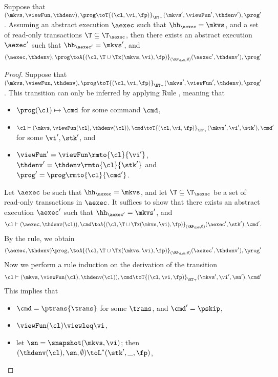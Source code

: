 \begin{proposition}
\label{prop:kv2aexec_transition}
Suppose that $(\mkvs, \viewFun, \thdenv), \prog \toT{(\cl, \vi, \fp)}_{\ET_{\top}} (\mkvs', 
\viewFun', \thdenv'), \prog'$. Assuming an abstract execution $\aexec$ 
such that $\hh_{\aexec} = \mkvs$, and a set of read-only transactions $\T \subseteq \T_{\aexec}$,
then there exists an abstract execution $\aexec'$ such that $\hh_{\aexec'} = \mkvs'$, and 
\[
(\aexec, \thdenv), \prog \toA{(\cl, \T \cup \Tx(\mkvs, \vi), \fp)}_{(\RP_{\LWW}, \emptyset)}
(\aexec', \thdenv'), \prog'
\]
\end{proposition}
\begin{proof}
Suppose that $(\mkvs, \viewFun, \thdenv), \prog \toT{(\cl, \vi, \fp)}_{\ET_{\top}} (\mkvs', \viewFun', \thdenv), \prog'$. 
This transition can only be inferred by applying Rule , meaning that 
\begin{itemize}
\item $\prog(\cl) \mapsto \cmd$ for some command $\cmd$, 
\item $\cl \vdash (\mkvs, \viewFun(\cl), \thdenv(\cl)), \cmd \toT{(\cl, \vi, \fp)}_{\ET_{\top}} (\mkvs', \vi', \stk'), \cmd'$ 
for some $\vi', \stk'$, and 
\item $\viewFun' = \viewFun\rmto{\cl}{\vi'}$, $\thdenv' = \thdenv\rmto{\cl}{\stk'}$ and $\prog' = \prog\rmto{\cl}{\cmd'}$. 
\end{itemize}
Let $\aexec$ be such that $\hh_{\aexec} = \mkvs$, and let $\T \subseteq \T_{\aexec}$ be a set of read-only transactions in $\aexec$. 
It suffices to show that there exists an abstract execution $\aexec'$ such that 
$\hh_{\aexec'} = \mkvs'$, and 
\[
    \cl \vdash (\aexec, \thdenv(\cl)), \cmd \toA{(\cl, \T \cup \Tx(\mkvs, \vi), \fp)}_{(\RP_{\LWW}, \emptyset)} (\aexec', \stk'), \cmd'.
\]
By the  rule, we obtain 
\[ 
    (\aexec, \thdenv) \prog, \toA{(\cl, \T \cup \Tx(\mkvs,\vi), \fp)}_{(\RP_{\LWW}, \emptyset)} (\aexec' ,\thdenv'), \prog'
\]
Now we perform a rule induction on the derivation of the transition 
\[
    \cl \vdash (\mkvs, \viewFun(\cl), \thdenv(\cl)), \cmd \toT{(\cl, \vi, \fp)}_{\ET_{\top}} (\mkvs', \vi', \sn'), \cmd'
\]
This implies that 
\begin{itemize}
\item $\cmd = \ptrans{\trans}$ for some $\trans$, and $\cmd' = \pskip$,
\item $\viewFun(\cl) \viewleq \vi$, 
\item let $\sn = \snapshot(\mkvs, \vi)$; then $(\thdenv(\cl), \sn, \emptyset) \toL^{\ast} (\stk', \_, \fp)$, 

\end{itemize}
\end{proof}
